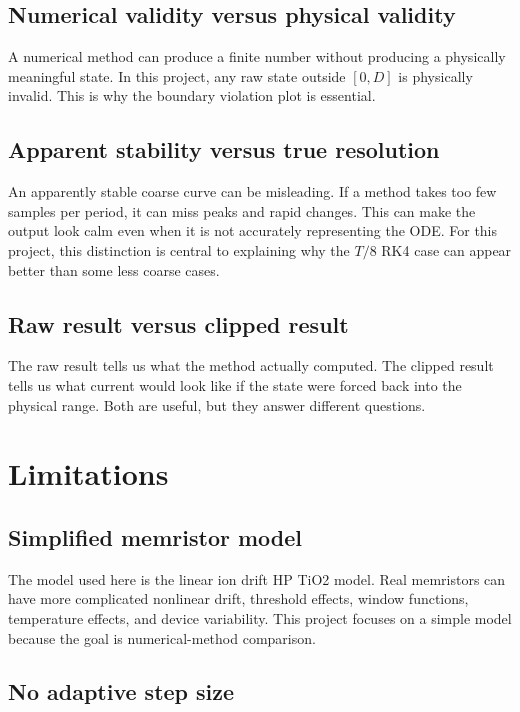 \documentclass[11pt]{article}
\begin{document}
\subsection{Numerical validity versus physical validity}

A numerical method can produce a finite number without producing a physically meaningful state. In this project, any raw state outside \([0,D]\) is physically invalid. This is why the boundary violation plot is essential.

\subsection{Apparent stability versus true resolution}

An apparently stable coarse curve can be misleading. If a method takes too few samples per period, it can miss peaks and rapid changes. This can make the output look calm even when it is not accurately representing the ODE. For this project, this distinction is central to explaining why the \(T/8\) RK4 case can appear better than some less coarse cases.

\subsection{Raw result versus clipped result}

The raw result tells us what the method actually computed. The clipped result tells us what current would look like if the state were forced back into the physical range. Both are useful, but they answer different questions.

\section{Limitations}

\subsection{Simplified memristor model}

The model used here is the linear ion drift HP TiO2 model. Real memristors can have more complicated nonlinear drift, threshold effects, window functions, temperature effects, and device variability. This project focuses on a simple model because the goal is numerical-method comparison.

\subsection{No adaptive step size}
\end{document}
